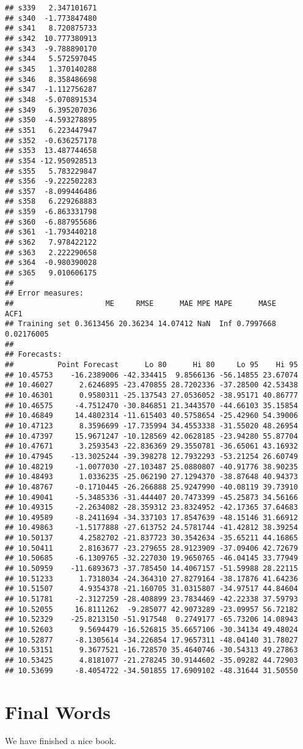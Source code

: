 \documentclass[
]{book}
\begin{document}
\begin{verbatim}
## s339   2.347101671
## s340  -1.773847480
## s341   8.720875733
## s342  10.777380913
## s343  -9.788890170
## s344   5.572597045
## s345   1.370140288
## s346   8.358486698
## s347  -1.112756287
## s348  -5.070891534
## s349   6.395207036
## s350  -4.593278895
## s351   6.223447947
## s352  -0.636257178
## s353  13.487744658
## s354 -12.950928513
## s355   5.783229847
## s356  -9.222502283
## s357  -8.099446486
## s358   6.229268883
## s359  -6.863331798
## s360  -6.887955686
## s361  -1.793440218
## s362   7.978422122
## s363   2.222290658
## s364  -0.980390028
## s365   9.010606175
## 
## Error measures:
##                     ME     RMSE      MAE MPE MAPE      MASE       ACF1
## Training set 0.3613456 20.36234 14.07412 NaN  Inf 0.7997668 0.02176005
## 
## Forecasts:
##          Point Forecast      Lo 80      Hi 80     Lo 95    Hi 95
## 10.45753    -16.2389006 -42.334415  9.8566136 -56.14855 23.67074
## 10.46027      2.6246895 -23.470855 28.7202336 -37.28500 42.53438
## 10.46301      0.9580311 -25.137543 27.0536052 -38.95171 40.86777
## 10.46575     -4.7512470 -30.846851 21.3443570 -44.66103 35.15854
## 10.46849     14.4802314 -11.615403 40.5758654 -25.42960 54.39006
## 10.47123      8.3596699 -17.735994 34.4553338 -31.55020 48.26954
## 10.47397     15.9671247 -10.128569 42.0628185 -23.94280 55.87704
## 10.47671      3.2593543 -22.836369 29.3550781 -36.65061 43.16932
## 10.47945    -13.3025244 -39.398278 12.7932293 -53.21254 26.60749
## 10.48219     -1.0077030 -27.103487 25.0880807 -40.91776 38.90235
## 10.48493      1.0336235 -25.062190 27.1294370 -38.87648 40.94373
## 10.48767     -0.1710445 -26.266888 25.9247990 -40.08119 39.73910
## 10.49041     -5.3485336 -31.444407 20.7473399 -45.25873 34.56166
## 10.49315     -2.2634082 -28.359312 23.8324952 -42.17365 37.64683
## 10.49589     -8.2411694 -34.337103 17.8547639 -48.15146 31.66912
## 10.49863     -1.5177888 -27.613752 24.5781744 -41.42812 38.39254
## 10.50137      4.2582702 -21.837723 30.3542634 -35.65211 44.16865
## 10.50411      2.8163677 -23.279655 28.9123909 -37.09406 42.72679
## 10.50685     -6.1309765 -32.227030 19.9650765 -46.04145 33.77949
## 10.50959    -11.6893673 -37.785450 14.4067157 -51.59988 28.22115
## 10.51233      1.7318034 -24.364310 27.8279164 -38.17876 41.64236
## 10.51507      4.9354378 -21.160705 31.0315807 -34.97517 44.84604
## 10.51781     -2.3127259 -28.408899 23.7834469 -42.22338 37.59793
## 10.52055     16.8111262  -9.285077 42.9073289 -23.09957 56.72182
## 10.52329    -25.8213150 -51.917548  0.2749177 -65.73206 14.08943
## 10.52603      9.5694479 -16.526815 35.6657106 -30.34134 49.48024
## 10.52877     -8.1305614 -34.226854 17.9657311 -48.04140 31.78027
## 10.53151      9.3677521 -16.728570 35.4640746 -30.54313 49.27863
## 10.53425      4.8181077 -21.278245 30.9144602 -35.09282 44.72903
## 10.53699     -8.4054722 -34.501855 17.6909102 -48.31644 31.50550
\end{verbatim}

\hypertarget{final-words}{%
\chapter{Final Words}\label{final-words}}

We have finished a nice book.

  
\end{document}
